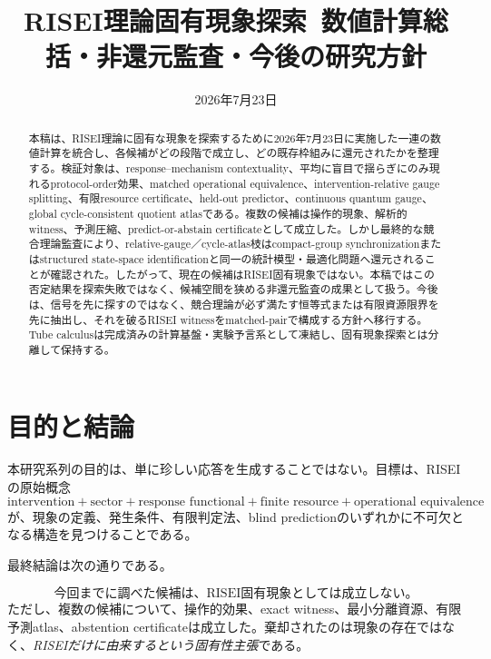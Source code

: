 \documentclass[11pt,a4paper,uplatex,dvipdfmx]{bxjsarticle}
\title{\textbf{RISEI理論固有現象探索}\
\Large 数値計算総括・非還元監査・今後の研究方針}
\author{}
\date{2026年7月23日}
\theoremstyle{remark}
\begin{document}
\maketitle

\begin{abstract}
本稿は、RISEI理論に固有な現象を探索するために2026年7月23日に実施した一連の数値計算を統合し、各候補がどの段階で成立し、どの既存枠組みに還元されたかを整理する。検証対象は、response--mechanism contextuality、平均に盲目で揺らぎにのみ現れるprotocol-order効果、matched operational equivalence、intervention-relative gauge splitting、有限resource certificate、held-out predictor、continuous quantum gauge、global cycle-consistent quotient atlasである。複数の候補は操作的現象、解析的witness、予測圧縮、predict-or-abstain certificateとして成立した。しかし最終的な競合理論監査により、relative-gauge／cycle-atlas枝はcompact-group synchronizationまたはstructured state-space identificationと同一の統計模型・最適化問題へ還元されることが確認された。したがって、現在の候補はRISEI固有現象ではない。本稿ではこの否定結果を探索失敗ではなく、候補空間を狭める非還元監査の成果として扱う。今後は、信号を先に探すのではなく、競合理論が必ず満たす恒等式または有限資源限界を先に抽出し、それを破るRISEI witnessをmatched-pairで構成する方針へ移行する。Tube calculusは完成済みの計算基盤・実験予言系として凍結し、固有現象探索とは分離して保持する。
\end{abstract}

\tableofcontents

\section{目的と結論}

本研究系列の目的は、単に珍しい応答を生成することではない。目標は、RISEIの原始概念
\begin{equation}
\text{intervention}
+\text{sector}
+\text{response functional}
+\text{finite resource}
+\text{operational equivalence}
\end{equation}
が、現象の定義、発生条件、有限判定法、blind predictionのいずれかに不可欠となる構造を見つけることである。

最終結論は次の通りである。

\begin{resultbox}[最終判定]
\begin{equation}
\boxed{\text{今回までに調べた候補は、RISEI固有現象としては成立しない。}}
\end{equation}
ただし、複数の候補について、操作的効果、exact witness、最小分離資源、有限予測atlas、abstention certificateは成立した。棄却されたのは現象の存在ではなく、\emph{RISEIだけに由来するという固有性主張}である。
\end{resultbox}
\end{document}
